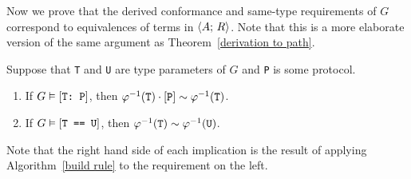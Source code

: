 \documentclass[../generics]{subfiles}
\begin{document}
Now we prove that the derived conformance and same-type requirements of $G$ correspond to equivalences of terms in $\langle A;\,R\rangle$. Note that this is a more elaborate version of the same argument as Theorem~\ref{derivation to path}.
\begin{theorem}\label{derivation to path swift}
Suppose that \texttt{T} and \texttt{U} are type parameters of $G$ and \texttt{P} is some protocol.
\begin{enumerate}
\item If $G\vDash[\texttt{T:~P}]$, then $\varphi^{-1}(\texttt{T})\cdot[\texttt{P}]\sim\varphi^{-1}(\texttt{T})$.
\item If $G\vDash[\texttt{T == U}]$, then $\varphi^{-1}(\texttt{T})\sim\varphi^{-1}(\texttt{U})$.
\end{enumerate}
Note that the right hand side of each implication is the result of applying Algorithm~\ref{build rule} to the requirement on the left.
\end{theorem}
\end{document}
